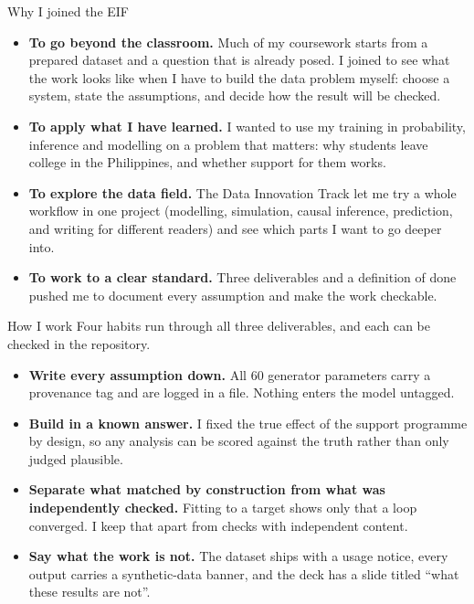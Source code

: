 \documentclass[aspectratio=169,11pt,t]{beamer}
\newcommand{\key}[1]{\textcolor{keyresult}{\textbf{#1}}}
\begin{document}
\begin{frame}{Why I joined the EIF}
  \small
  \begin{itemize}\setlength\itemsep{4pt}
    \item \key{To go beyond the classroom.} Much of my coursework starts from a prepared
          dataset and a question that is already posed. I joined to see what the work
          looks like when I have to build the data problem myself: choose a system, state
          the assumptions, and decide how the result will be checked.
    \item \key{To apply what I have learned.} I wanted to use my training in probability,
          inference and modelling on a problem that matters: why students leave college in
          the Philippines, and whether support for them works.
    \item \key{To explore the data field.} The Data Innovation Track let me try a whole
          workflow in one project (modelling, simulation, causal inference, prediction, and
          writing for different readers) and see which parts I want to go deeper into.
    \item \key{To work to a clear standard.} Three deliverables and a definition of done
          pushed me to document every assumption and make the work checkable.
  \end{itemize}
\end{frame}

\begin{frame}{How I work}
  \small
  Four habits run through all three deliverables, and each can be checked in
  the repository.
  \medskip

  \begin{itemize}
    \item \key{Write every assumption down.} All 60 generator parameters carry a
          provenance tag and are logged in a file. Nothing enters the model untagged.
    \item \key{Build in a known answer.} I fixed the true effect of the support
          programme by design, so any analysis can be scored against the truth
          rather than only judged plausible.
    \item \key{Separate what matched by construction from what was independently
          checked.} Fitting to a target shows only that a loop converged. I keep
          that apart from checks with independent content.
    \item \key{Say what the work is not.} The dataset ships with a usage notice,
          every output carries a synthetic-data banner, and the deck has a slide
          titled ``what these results are not''.
  \end{itemize}
\end{frame}
\end{document}
